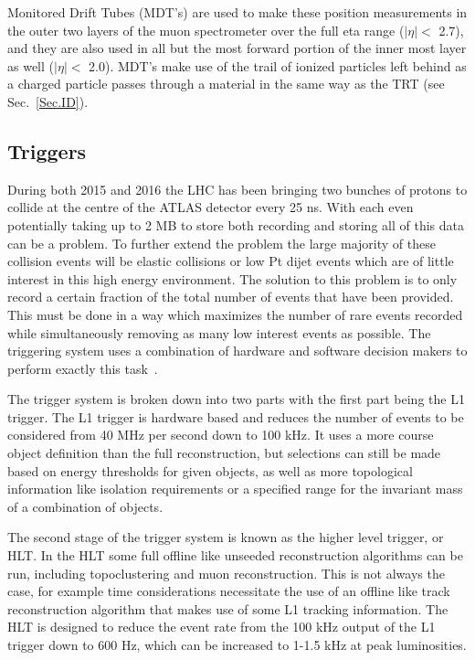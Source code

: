 Monitored Drift Tubes (MDT's) are used to make these position measurements in the outer two layers of the muon spectrometer over the full eta range ($\mid\eta\mid<$ 2.7), and they are also used in all but the most forward portion of the inner most layer as well ($\mid\eta\mid<$ 2.0).  
MDT's make use of the trail of ionized particles left behind as a charged particle passes through a material in the same way as the TRT (see Sec.~\ref{Sec.ID}).  
 
 

\subsection{Triggers}
\label{Trig}
During both 2015 and 2016 the LHC has been bringing two bunches of protons to collide at the centre of the ATLAS detector every 25 ns.  
With each even potentially taking up to 2 MB to store both recording and storing all of this data can be a problem.  
To further extend the problem the large majority of these collision events will be elastic collisions or low Pt dijet events which are of little interest in this high energy environment.  
The solution to this problem is to only record a certain fraction of the total number of events that have been provided.  
This must be done in a way which maximizes the number of rare events recorded while simultaneously removing as many low interest events as possible.  
The triggering system uses a combination of hardware and software decision makers to perform exactly this task~\cite{Run2Triggers}.  

The trigger system is broken down into two parts with the first part being the L1 trigger.  
The L1 trigger is hardware based and reduces the number of events to be considered from 40 MHz per second down to 100 kHz.  
It uses a more course object definition than the full reconstruction, but selections can still be made based on energy thresholds for given objects, as well as more topological information like isolation requirements or a specified range for the invariant mass of a combination of objects.  

The second stage of the trigger system is known as the higher level trigger, or HLT.  
In the HLT some full offline like unseeded reconstruction algorithms can be run, including topoclustering and muon reconstruction.  
This is not always the case, for example time considerations necessitate the use of an offline like track reconstruction algorithm that makes use of some L1 tracking information.  
The HLT is designed to reduce the event rate from the 100 kHz output of the L1 trigger down to 600 Hz, which can be increased to 1-1.5 kHz at peak luminosities.  

